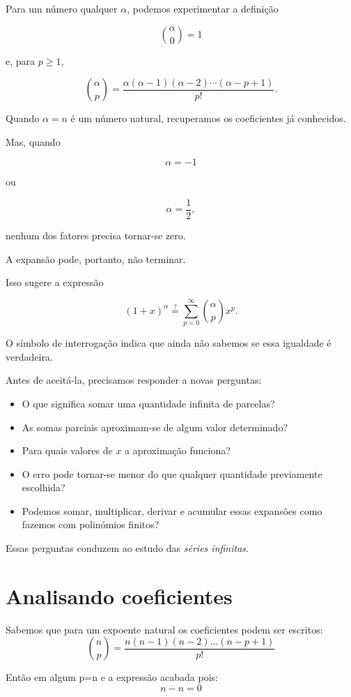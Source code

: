 \documentclass[12pt,a4paper]{article}
\begin{document}
Para um número qualquer \(\alpha\), podemos experimentar a definição

\[
\binom{\alpha}{0}=1
\]

e, para \(p\geq1\),

\[
\binom{\alpha}{p}
=
\frac{
\alpha(\alpha-1)(\alpha-2)\cdots(\alpha-p+1)
}{p!}.
\]

Quando \(\alpha=n\) é um número natural, recuperamos os coeficientes já
conhecidos.

Mas, quando

\[
\alpha=-1
\]

ou

\[
\alpha=\frac12,
\]

nenhum dos fatores precisa tornar-se zero.

A expansão pode, portanto, não terminar.

Isso sugere a expressão

\[
(1+x)^\alpha
\stackrel{?}{=}
\sum_{p=0}^{\infty}
\binom{\alpha}{p}x^p.
\]

O símbolo de interrogação indica que ainda não sabemos se essa igualdade
é verdadeira.

Antes de aceitá-la, precisamos responder a novas perguntas:

\begin{itemize}
    \item O que significa somar uma quantidade infinita de parcelas?
    \item As somas parciais aproximam-se de algum valor determinado?
    \item Para quais valores de \(x\) a aproximação funciona?
    \item O erro pode tornar-se menor do que qualquer quantidade
    previamente escolhida?
    \item Podemos somar, multiplicar, derivar e acumular essas expansões
    como fazemos com polinómios finitos?
\end{itemize}

Essas perguntas conduzem ao estudo das \emph{séries infinitas}.

\section{Analisando coeficientes}

Sabemos que para um expoente natural os coeficientes podem ser escritos:
    \[\binom{n}{p} = \frac{n(n-1)(n-2)...(n-p+1)}{p!}\]

Então em algum p=n e a expressão acabada pois:
    \[n-n = 0\]
\end{document}
